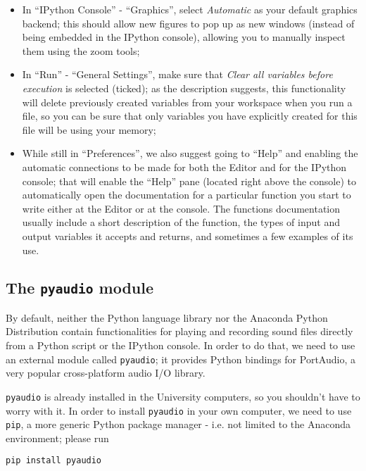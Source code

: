 \begin{itemize}
	\item In ``IPython Console'' - ``Graphics'', select \emph{Automatic} as your default graphics backend; this should allow new figures to pop up as new windows (instead of being embedded in the IPython console), allowing you to manually inspect them using the zoom tools;
	\item In ``Run'' - ``General Settings'', make sure that \emph{Clear all variables before execution} is selected (ticked); as the description suggests, this functionality will delete previously created variables from your workspace when you run a file, so you can be sure that only variables you have explicitly created for this file will be using your memory;
	\item While still in ``Preferences'', we also suggest going to ``Help'' and enabling the automatic connections to be made for both the Editor and for the IPython console; that will enable the ``Help'' pane  (located right above the console) to automatically open the documentation for a particular function you start to write either at the Editor or at the console. The functions documentation usually include a short description of the function, the types of input and output variables it accepts and returns, and sometimes a few examples of its use.
\end{itemize}


\subsection{The {\tt pyaudio} module}

By default, neither the Python language library nor the Anaconda Python Distribution contain functionalities for playing and recording sound files directly from a Python script or the IPython console. In order to do that, we need to use an external module called {\tt pyaudio}; it provides Python bindings for PortAudio, a very popular cross-platform audio I/O library.

{\tt pyaudio} is already installed in the University computers, so you shouldn't have to worry with it. In order to install {\tt pyaudio} in your own computer, we need to use {\tt pip}, a more generic Python package manager - i.e. not limited to the Anaconda environment; please run

\begin{lstlisting}[frame=single]
pip install pyaudio
\end{lstlisting}

